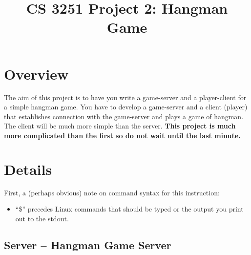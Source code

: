 \documentclass[12pt]{article}
\begin{document}
\title{CS 3251 Project 2: Hangman Game}
\date{}

\maketitle

\section{Overview}\label{sec:overview}

The aim of this project is to have you write a game-server and a player-client for a simple
hangman game.
You have to develop a game-server and a client (player) that establishes connection with the
game-server and plays a game of hangman.
The client will be much more simple than the
server.
{\bf This project is much more complicated than the first so do not wait until the last minute.}

\section{Details}\label{sec:details}

First, a (perhaps obvious) note on command syntax for this instruction:

\begin{itemize}
\item ``\$'' precedes Linux commands that should be typed or the output you print out to the stdout.
\end{itemize}


\subsection{Server -- Hangman Game Server }\label{subsec:server--HangmanGameServer}
\end{document}
